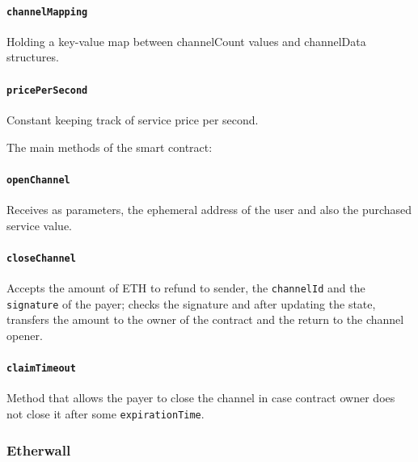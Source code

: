 \documentclass[12pt]{amsart}
\begin{document}
\begin{multicols}{2}
\vspace{0.35cm}

\paragraph{\texttt{channelMapping}} Holding a key-value map between
channelCount values and channelData structures.

\vspace{0.35cm}

\paragraph{\texttt{pricePerSecond}} Constant keeping track of
service price per second.

\vspace{0.35cm}

The main methods of the smart contract:

\vspace{0.35cm}

\paragraph{\texttt{openChannel}} Receives as parameters, the ephemeral address
of the user and also the purchased service value.

\vspace{0.35cm}

\paragraph{\texttt{closeChannel}} Accepts the amount of ETH to refund
to sender, the \texttt{channelId} and the \texttt{signature} of the
payer; checks the signature and after updating the state, transfers
the amount to the owner of the contract and the return to the channel
opener.

\vspace{0.35cm}


\paragraph{\texttt{claimTimeout}} Method that allows the payer to
close the channel in case contract owner does not close it after
some \texttt{expirationTime}.

\subsubsection{Etherwall}


\end{multicols}
\end{document}
